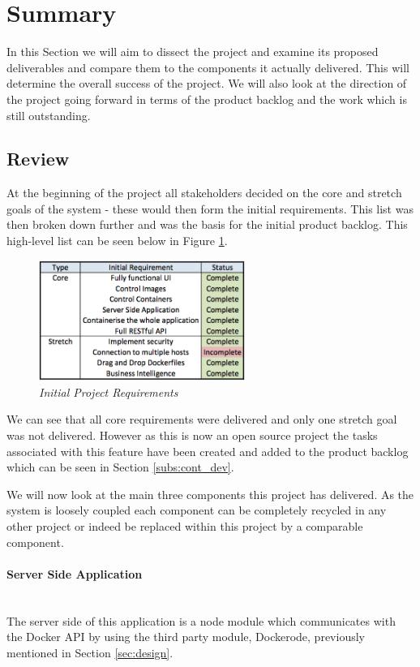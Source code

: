 \section{Summary}
\label{sec:summary}
In this Section we will aim to dissect the project and examine its proposed deliverables and compare them to the components it actually delivered. This will determine the overall success of the project. We will also look at the direction of the project going forward in terms of the product backlog and the work which is still outstanding.

\subsection{Review}
At the beginning of the project all stakeholders decided on the core and stretch goals of the system - these would then form the initial requirements. This list was then broken down further and was the basis for the initial product backlog. This high-level list can be seen below in Figure \ref{fig:requirements}.

\begin{figure}[!ht]
\centering
\includegraphics*[width=0.6\textwidth]{images/requirements}
\caption{\em Initial Project Requirements}
\label{fig:requirements}
\end{figure}

We can see that all core requirements were delivered and only one stretch goal was not delivered. However as this is now an open source project the tasks associated with this feature have been created and added to the product \gls{backlog} which can be seen in Section \ref{subs:cont_dev}.

We will now look at the main three components this project has delivered. As the system is loosely coupled each component can be completely recycled in any other project or indeed be replaced within this project by a comparable component.

\paragraph{Server Side Application}\mbox{}\\
The server side of this application is a node module which communicates with the Docker API by using the third party module, Dockerode, previously mentioned in Section \ref{sec:design}.

